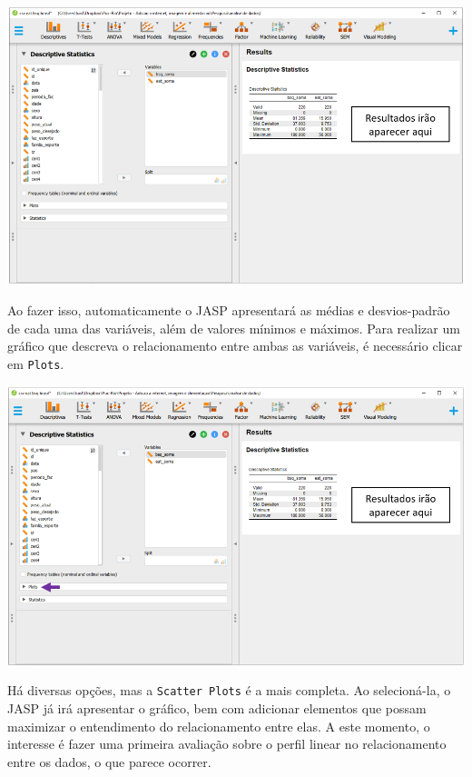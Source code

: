 \documentclass[
]{book}
\begin{document}
\includegraphics{./img/cap_reg_descritivo.png}

Ao fazer isso, automaticamente o JASP apresentará as médias e
desvios-padrão de cada uma das variáveis, além de valores mínimos e
máximos. Para realizar um gráfico que descreva o relacionamento entre
ambas as variáveis, é necessário clicar em \texttt{Plots}.

\includegraphics{./img/cap_reg_plot.png}

Há diversas opções, mas a \texttt{Scatter\ Plots} é a mais completa. Ao
selecioná-la, o JASP já irá apresentar o gráfico, bem com adicionar
elementos que possam maximizar o entendimento do relacionamento entre
elas. A este momento, o interesse é fazer uma primeira avaliação sobre o
perfil linear no relacionamento entre os dados, o que parece ocorrer.
\end{document}
